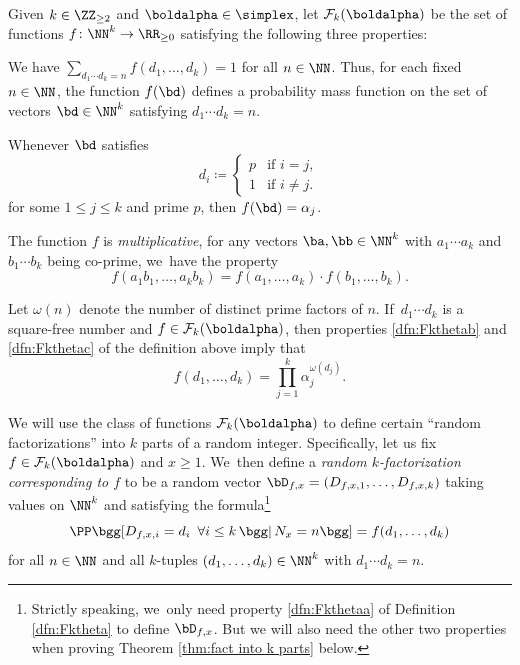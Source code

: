 \begin{deff}\label{dfn:Fktheta}
Given $k\in\ZZ_{\ge2}$ and $\boldalpha\in \simplex$, let $\mathcal F_k(\boldalpha)$ be the set of functions $f \colon \NN^{k} \to \RR_{ \ge 0}$ satisfying the following three properties:
\begin{enumeratea}
\item\label{dfn:Fkthetaa} We have $\sum_{d_1\cdots d_k = n} f(d_1, \ldots, d_k) = 1$ for all $n \in \NN$. Thus, for each fixed $n \in \NN$, the function $f(\bd)$ defines a probability mass function on the set of vectors $\bd \in \NN^k$ satisfying $d_1\cdots d_k = n$.

\item\label{dfn:Fkthetab} Whenever $\bd$ satisfies
\[
d_i \coloneqq \begin{cases}
p &\text{if $i = j$}, \\
1 &\text{if $i \ne j$}.
\end{cases}
\]
for some $1 \le j \le k$ and prime $p$, then $f(\bd) = \alpha_j$.

\item\label{dfn:Fkthetac} The function $f$ is \emph{multiplicative}, \ie for any vectors $\ba, \bb \in \NN^k$ with $a_1\cdots a_k$ and $b_1 \cdots b_k$ being co-prime, we~have the property
\[
f(a_1b_1, \ldots, a_kb_k) = f(a_1, \ldots, a_k) \cdot f(b_1, \ldots, b_k).
\]
\end{enumeratea}
\end{deff}

\begin{rems}
Let $\omega(n)$ denote the number of distinct prime factors of $n$. If~$d_1\cdots d_k$ is a square-free number and $f\in\mathcal{F}_k (\boldalpha)$, then properties \eqref{dfn:Fkthetab} and \eqref{dfn:Fkthetac} of the definition above imply that
\begin{equation}
\label{eq:f on squarefrees}
f(d_1,\dots,d_k) = \prod_{j=1}^k \alpha_j^{\omega(d_j)}.
\end{equation}
\end{rems}

We will use the class of functions $\mathcal{F}_k(\boldalpha)$ to define certain ``random factorizations'' into $k$ parts of a random integer. Specifically, let us fix $f\in\mathcal{F}_k(\boldalpha)$ and $x\ge1$. We~then define a {\it random $k$-factorization corresponding to $f$} to be a random vector $\bD_{f, x}=(D_{f,x,1},\dots,D_{f,x,k})$ taking values on $\NN^k$ and satisfying the formula\footnote{Strictly speaking, we~only need property \eqref{dfn:Fkthetaa} of Definition \ref{dfn:Fktheta} to define $\bD_{f,x}$. But we will also need the other two properties when proving Theorem \ref{thm:fact into k parts} below.}
\begin{equation}
\label{eq:prob mass function f}
\PP\bgg[D_{f,x,i} = d_i \ \, \forall i \le k\, \bgg|\, N_x = n\bgg] = f(d_1, \ldots, d_k)
\end{equation}
for all $n\in\NN$ and all $k$-tuples $(d_1,\dots,d_k)\in\NN^k$ with $d_1\cdots d_k=n$.

